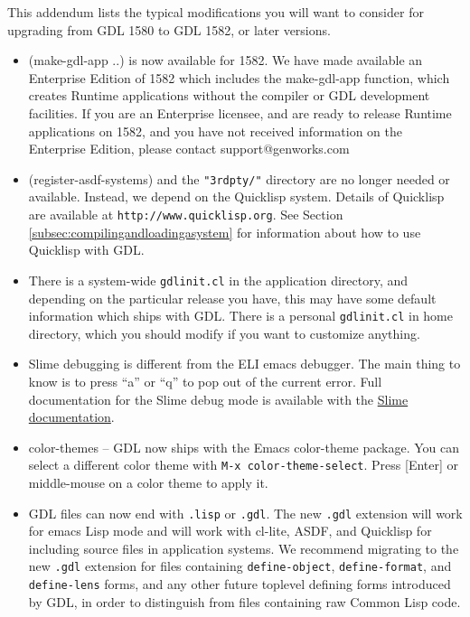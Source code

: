 \documentclass [11pt]{book}
\begin{document}
This addendum lists the typical modifications you will want to
consider for upgrading from GDL 1580 to GDL 1582, or later versions.

\begin{itemize}

\item (make-gdl-app ..) is now available for 1582. We have
made available an Enterprise Edition of 1582 which includes the
make-gdl-app function, which creates Runtime applications without the
compiler or GDL development facilities.  If you are an Enterprise
licensee, and are ready to release Runtime applications on 1582, and
you have not received information on the Enterprise Edition, please
contact support@genworks.com

\item (register-asdf-systems) and the \texttt{"3rdpty/"} directory are no longer needed or available. Instead, we depend on the Quicklisp
system. Details of Quicklisp are available at \texttt{http://www.quicklisp.org}. See Section 
\ref{subsec:compilingandloadingasystem} for information about how to use Quicklisp with GDL.

\item There is a system-wide \texttt{gdlinit.cl} in the application directory, and depending on the
       particular release you have, this may have some default
       information which ships with GDL. There is a personal \texttt{gdlinit.cl} in home directory, which you should modify if you want to
       customize anything.

\item Slime debugging is different from the ELI emacs debugger. The main thing to know is 
to press ``a'' or ``q'' to pop out of the current error. Full documentation for the Slime debug mode
is available with the \href{http://common-lisp.net/project/slime/doc/html/Debugger.html}{Slime documentation}.

\item color-themes -- GDL now ships with the Emacs
       color-theme package. You can select a different color theme with \texttt{M-x color-theme-select}. Press [Enter] or middle-mouse on a color theme to apply it.

\item GDL files can now end with \texttt{.lisp} or \texttt{.gdl}. The new \texttt{.gdl} extension will work for emacs Lisp mode and will work with
	 cl-lite, ASDF, and Quicklisp for including source files in application systems. We recommend migrating
to the new \texttt{.gdl} extension for files containing \texttt{define-object}, \texttt{define-format}, and \texttt{define-lens} forms, and any other future toplevel defining forms introduced by GDL, in order to distinguish 
from files containing raw Common Lisp code.


\end{itemize}
\end{document}
